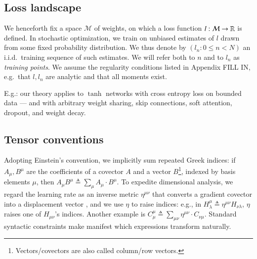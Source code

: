 \documentclass{article}
\theoremstyle{plain}
\theoremstyle{definition}
\newcommand{\Mm}{\mathcal{M}}
\begin{document}

    \subsection{Loss landscape}


        We henceforth fix a space $\Mm$ of weights, on which a loss function
        $l:\Mm\to\RR$ is defined.  In stochastic optimization, we train on
        unbiased estimates of $l$ drawn from some fixed probability
        distribution.  We thus denote by $(l_n: 0\leq n<N)$ an i.i.d.\ training
        sequence of such estimates.  We will refer both to $n$ and to $l_n$ as
        \emph{training points}.  We assume the regularity conditions listed in
        Appendix {\color{red} FILL IN}, e.g.\ that $l, l_n$ are analytic and
        that all moments exist.


        E.g.: our theory applies to $\tanh$ networks with cross entropy
        loss on bounded data --- and with arbitrary weight sharing, skip
        connections, soft attention, dropout, and weight decay.
        

    \subsection{Tensor conventions}
        Adopting Einstein's convention, we implicitly sum repeated Greek
        indices: if $A_\mu, B^\mu$ are the coefficients of a covector $A$ and a
        vector $B$\footnote{
            Vectors/covectors are also called column/row vectors.
        }, indexed by basis elements $\mu$, then
        $
            A_\mu B^\mu
            \triangleq
            \sum_\mu A_\mu \cdot B^\mu
        $.
        To expedite dimensional analysis, we regard the learning rate as an
        inverse metric $\eta^{\mu\nu}$ that converts a gradient covector into a
        displacement vector \citep{bo13}, and we use $\eta$ to raise indices:
        e.g., in
        $
            H^{\mu}_{\lambda}
            \triangleq
            \eta^{\mu\nu} H_{\nu\lambda}
        $,
        $\eta$ raises one of $H_{\mu\nu}$'s indices.  Another example is
        $
            C^{\mu}_{\mu}
            \triangleq
            \sum_{\mu \nu} \eta^{\mu\nu} \cdot C_{\nu\mu}
        $.
        Standard syntactic constraints make manifest which expressions
        transform naturally.%
\end{document}
